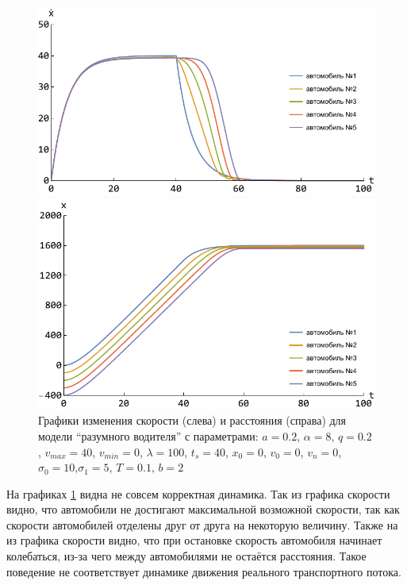 \documentclass[12pt, a4paper]{extarticle}
\numberwithin{equation}{section}
\numberwithin{figure}{section}
\begin{document}
\begin{figure}[h!]
	\begin{center}
		\begin{minipage}[h!]{0.48\linewidth}
			\includegraphics[width=1\linewidth,height=0.2\textheight]
			{Images/treiber_model_speed.pdf}
		\end{minipage}
		\hfill 
		\begin{minipage}[h!]{0.48\linewidth}
			\includegraphics[width=1\linewidth,height=0.2\textheight]
			{Images/treiber_model_distance.pdf}
		\end{minipage}
		\caption{Графики изменения скорости (слева) и расстояния (справа) для модели ``разумного водителя'' с параметрами: $a=0.2$, $\alpha=8$, $q=0.2$, $v_{max}=40$, $v_{min}=0$, $\lambda=100$, $t_s=40$, $x_0=0$, $v_0=0$, $v_n=0$, $\sigma_0=10$,$\sigma_1=5$, $T=0.1$, $b=2$ }
		\label{treiber_model_img}
	\end{center}
\end{figure}

На графиках \ref{treiber_model_img} видна не совсем корректная динамика. Так из графика скорости видно, что автомобили не достигают максимальной возможной скорости, так как скорости автомобилей отделены друг от друга на некоторую величину. Также на из графика скорости видно, что при остановке скорость автомобиля начинает колебаться, из-за чего между автомобилями не остаётся расстояния. Такое поведение не соответствует динамике движения реального транспортного потока. 
\end{document}
